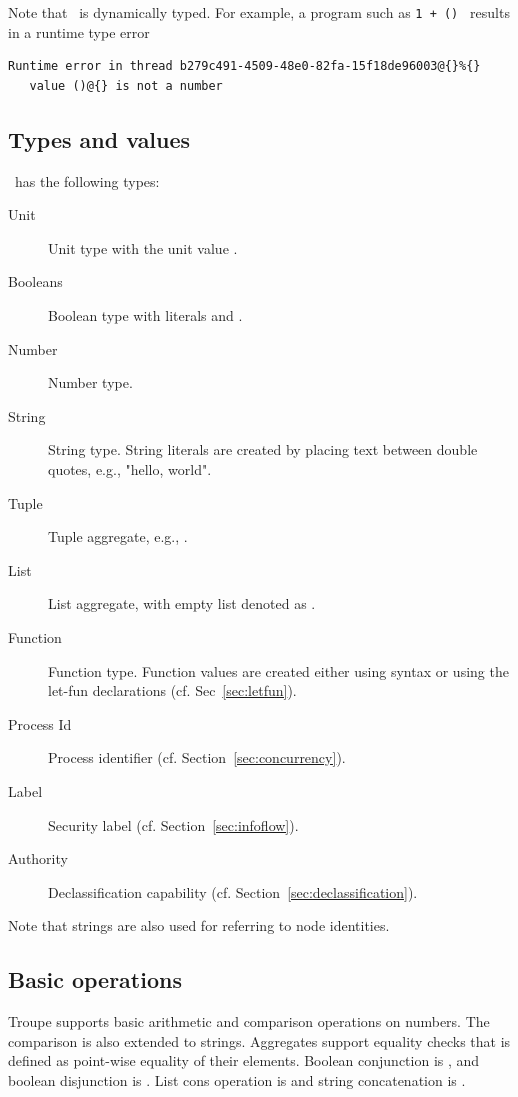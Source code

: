 Note that \troupelang\ is dynamically typed. For example, a program such as {\tt 1 + () } results in a 
runtime type error

\begin{verbatim}
Runtime error in thread b279c491-4509-48e0-82fa-15f18de96003@{}%{}
   value ()@{} is not a number    
\end{verbatim}

\subsection{Types and values}
\troupelang\ has the following types:
\begin{description}
\item [Unit] Unit type with the unit value \textcode{()}.
\item [Booleans] Boolean type with literals  and .
\item [Number] Number type.
\item [String] String type. String literals are created by placing text between double quotes, e.g., "hello, world".
\item [Tuple] Tuple aggregate, e.g., .
\item [List] List aggregate, with empty list denoted as \textcode{[]}.
\item [Function] Function type. Function values are created either using  syntax or using the let-fun declarations (cf. Sec~\ref{sec:letfun}).
\item [Process Id] Process identifier (cf. Section~\ref{sec:concurrency}).
\item [Label] Security label (cf. Section~\ref{sec:infoflow}).
\item [Authority] Declassification capability (cf. Section~\ref{sec:declassification}).
\end{description}
Note that strings are also used for referring to node identities.


\subsection{Basic operations}
Troupe supports basic arithmetic and comparison operations on numbers. The comparison is also extended to strings. 
Aggregates support equality checks that is defined as point-wise equality of their elements. Boolean conjunction is 
, and boolean disjunction is . List cons operation is \textcode{::} and 
string concatenation is {\textcode{\^{}}}.

